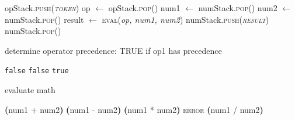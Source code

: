 \documentclass{article}
\begin{document}
\begin{algorithm}
\begin{algorithmic}[1]
                                        \State opStack.\textsc{push(\textit{token})}
                                \EndIf
                        \EndWhile
                                \State op $ \gets $ opStack.\textsc{pop}()
                                \State num1 $ \gets $ numStack.\textsc{pop}()
                                \State num2 $ \gets $ numStack.\textsc{pop}()
                                \State result $ \gets $ \textsc{eval}(\textit{op, num1, num2})
                                \State numStack.\textsc{push(\textit{result})}
                        \EndWhile
                        \State \Return numStack.\textsc{pop()}
                        \EndFunction
                \end{algorithmic}
        \end{algorithm}
    
    \begin{algorithm}
    	\caption{determine operator precedence: TRUE if op1 has precedence}
    	\label{opPrec}
    	\begin{algorithmic}[1]
    				\State \Return \texttt{false}
    				\State \Return \texttt{false}
    			\Else 
    				\State \Return \texttt{true}
    			\EndIf
    		\EndFunction
    	\end{algorithmic}
    \end{algorithm}
    
    \begin{algorithm}
    	\caption{evaluate math}
    	\label{eval}
    	\begin{algorithmic}[1]
    				\State \Return \textbf{(}num1 + num2\textbf{)}
    				\State \Return \textbf{(}num1 - num2\textbf{)}
    				\State \Return \textbf{(}num1 * num2\textbf{)}
    					\State \Return \textsc{error}
    				\Else
    					\State \Return \textbf{(}num1 / num2\textbf{)}
    				\EndIf
    			\EndIf
    		\EndFunction
    	\end{algorithmic}
    \end{algorithm}
\end{document}
